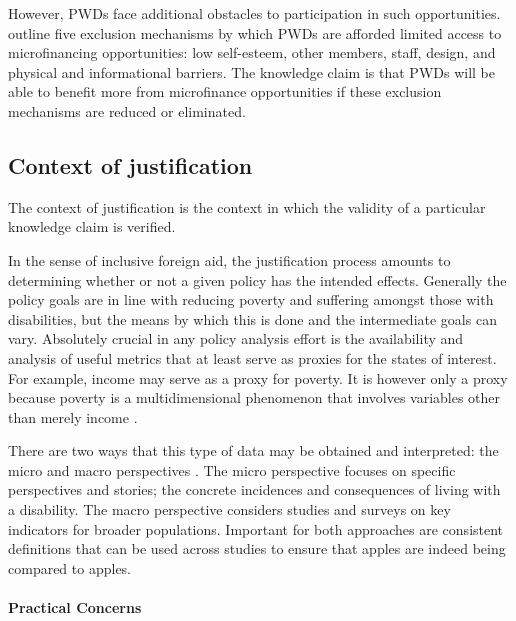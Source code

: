 \documentclass[a4paper]{article}
\begin{document}
However, PWDs face additional obstacles to participation in such
opportunities. \cite{mersland2008access} outline five exclusion mechanisms by
which PWDs are afforded limited access to microfinancing opportunities: low
self-esteem, other members, staff, design, and physical and informational
barriers. The knowledge claim is that PWDs will be able to benefit more from
microfinance opportunities if these exclusion mechanisms are reduced or
eliminated.

\subsection{Context of justification}

The context of justification is the context in which the validity of a
particular knowledge claim is verified. 

In the sense of inclusive foreign aid, the justification process amounts to
determining whether or not a given policy has the intended effects. Generally
the policy goals are in line with reducing poverty and suffering amongst those
with disabilities, but the means by which this is done and the intermediate
goals can vary. Absolutely crucial in any policy analysis effort is the
availability and analysis of useful metrics that at least serve as proxies for
the states of interest.  For example, income may serve as a proxy for poverty.
It is however only a proxy because poverty is a multidimensional phenomenon
that involves variables other than merely income
\citep{alkire2011understandings}. 

There are two ways that this type of data may be obtained and interpreted: the
micro and macro perspectives \citep{ingstad2011disability}. 
The micro perspective focuses on specific perspectives and stories; the
concrete incidences and consequences of living with a disability. The macro
perspective considers studies and surveys on key indicators for broader
populations. Important for both approaches are consistent definitions that can
be used across studies to ensure that apples are indeed being compared to
apples. 

\paragraph{Practical Concerns}
\end{document}
